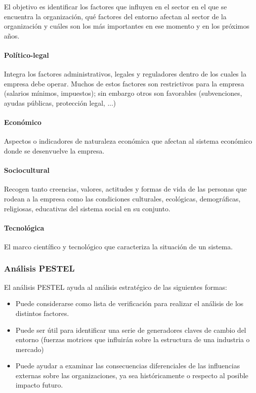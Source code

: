 \documentclass[12pt]{article}
\theoremstyle{definition_wo_parentheses}
\begin{document}
El objetivo es identificar los factores que influyen en el sector en el que se encuentra la organización, qué factores del entorno afectan al sector de la organización y cuáles son los más importantes en ese momento y en los próximos años.

\paragraph{Político-legal} Integra los factores administrativos, legales y reguladores dentro de los cuales la empresa debe operar. Muchos de estos factores son restrictivos para la empresa (salarios mínimos, impuestos); sin embargo otros son favorables (subvenciones, ayudas públicas, protección legal, ...)

\paragraph{Económico} Aspectos o indicadores de naturaleza económica que afectan al sistema económico donde se desenvuelve la empresa.

\paragraph{Sociocultural} Recogen tanto creencias, valores, actitudes y formas de vida de las personas que rodean a la empresa como las condiciones culturales, ecológicas, demográficas, religiosas, educativas del sistema social en su conjunto.

\paragraph{Tecnológica} El marco científico y tecnológico que caracteriza la situación de un sistema.

\subsubsection{Análisis PESTEL}

El análisis PESTEL ayuda al análisis estratégico de las siguientes formas:

\begin{itemize}
\item Puede considerarse como lista de verificación para realizar el análisis de los distintos factores.
\item Puede ser útil para identificar una serie de generadores claves de cambio del entorno (fuerzas motrices que influirán sobre la estructura de una industria o mercado)
\item Puede ayudar a examinar las consecuencias diferenciales de las influencias externas sobre las organizaciones, ya sea históricamente o respecto al posible impacto futuro.
\end{itemize}
\end{document}
